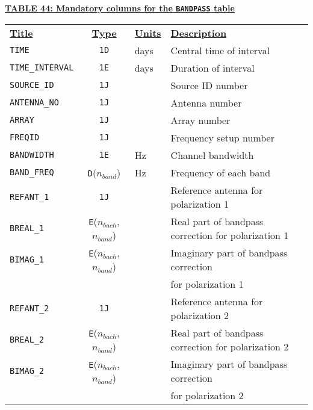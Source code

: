 \documentclass[twoside]{article}
\newcommand{\nband}{$n_{band}$}
\newcommand{\nbach}{$n_{bach}$}
\begin{document}
\begin{center}
\underline{\bf{TABLE 44: Mandatory columns for the {\tt BANDPASS}
    table}}\\
\begin{tabular}{lcll}
\noalign{\vspace{2pt}}
\underline{{\bf Title\vphantom{y}}} & \underline{\bf{Type}} &
   \underline{{\bf Units\vphantom{y}}} & \underline{\bf{Description}} \\
\noalign{\vspace{2pt}}
{\tt TIME}        & {\tt 1D} & days  & Central time of interval \\
{\tt TIME\_INTERVAL} & {\tt 1E} & days & Duration of interval \\
{\tt SOURCE\_ID}  & {\tt 1J} &       & Source ID number \\
{\tt ANTENNA\_NO} & {\tt 1J} &       & Antenna number \\
{\tt ARRAY}       & {\tt 1J} &       & Array number \\
{\tt FREQID}      & {\tt 1J} &       & Frequency setup number \\
{\tt BANDWIDTH}   & {\tt 1E} & Hz    & Channel bandwidth \\
{\tt BAND\_FREQ}  & {\tt D}(\nband) & Hz & Frequency of each band \\
{\tt REFANT\_1}   & {\tt 1J} &       & Reference antenna for
                                       polarization 1 \\
{\tt BREAL\_1}    & {\tt E}(\nbach,\nband) & & Real part of
                                       bandpass correction for
                                       polarization 1 \\
{\tt BIMAG\_1}     & {\tt E}(\nbach,\nband) & & Imaginary part of
                                       bandpass correction \\
     &                        & & \hspace{1em} for polarization 1 \\
\hline
{\tt REFANT\_2}   & {\tt 1J} &       & Reference antenna for
                                       polarization 2 \\
{\tt BREAL\_2}    & {\tt E}(\nbach,\nband) & & Real part of
                                       bandpass correction for
                                       polarization 2 \\
{\tt BIMAG\_2}     & {\tt E}(\nbach,\nband) & & Imaginary part of
                                       bandpass correction \\
     &                        & & \hspace{1em} for polarization 2 \\
\end{tabular}
\end{center}
\end{document}
